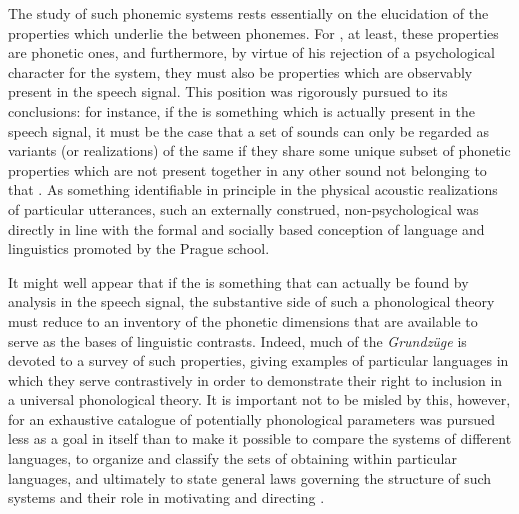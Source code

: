 The study of such phonemic systems rests essentially on the
elucidation of the properties which underlie the  between
phonemes. For {\Trubetzkoy}, at least, these properties are phonetic
ones, and furthermore, by virtue of his rejection of a psychological
character for the system, they must also be properties which are
observably present in the speech signal. This position was rigorously
pursued to its conclusions: for instance, if the  is something
which is actually present in the speech signal, it must be the case
that a set of sounds can only be regarded as variants (or
realizations) of the same  if they share some unique subset of
phonetic properties which are not present together in any other sound
not belonging to that . As something identifiable in principle
in the physical acoustic realizations of particular utterances, such
an externally construed, non-psychological  was directly in line
with the formal and socially based conception of language and
linguistics promoted by the Prague school.

It might well appear that if the  is something that can
actually be found by analysis in the speech signal, the substantive
side of such a phonological theory must reduce to an inventory of the
phonetic dimensions that are available to serve as the bases of
linguistic contrasts. Indeed, much of the \textsl{Grundzüge} is
devoted to a survey of such properties, giving examples of particular
languages in which they serve contrastively in order to demonstrate
their right to inclusion in a universal phonological theory. It is
important not to be misled by this, however, for an exhaustive
catalogue of potentially phonological parameters was pursued less as a
goal in itself than to make it possible to compare the systems of
different languages, to organize and classify the sets of 
obtaining within particular languages, and ultimately to state general
laws governing the structure of such systems and their role in
motivating and directing .

